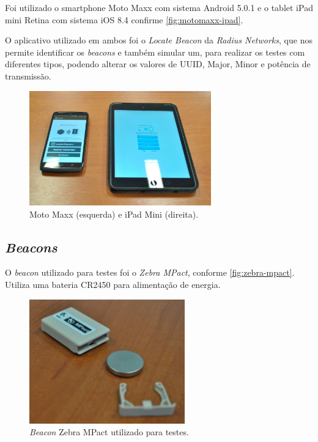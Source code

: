 Foi utilizado o smartphone Moto Maxx com sistema Android 5.0.1 e o tablet iPad mini Retina com sistema iOS 8.4 confirme \autoref{fig:motomaxx-ipad}. 

O aplicativo utilizado em ambos foi o \textit{Locate Beacon} da \textit{Radius Networks}, que nos permite identificar os \textit{beacons} e também simular um, para realizar os testes com diferentes tipos, podendo alterar os valores de UUID, Major, Minor e potência de transmissão. 

\begin{figure}[htb]
	\caption{\label{fig:motomaxx-ipad}Moto Maxx (esquerda) e iPad Mini (direita).}
	\begin{center}
		\includegraphics[width=0.7\textwidth]{img/motomaxx-ipad.jpg}
	\end{center}
\end{figure}

\subsection{\textit{Beacons}}\label{sec:beacons-modo}

O \textit{beacon} utilizado para testes foi o \textit{Zebra MPact}, conforme \autoref{fig:zebra-mpact}. Utiliza uma bateria CR2450 para alimentação de energia. 

\begin{figure}[htb]
	\caption{\label{fig:zebra-mpact}\textit{Beacon} Zebra MPact utilizado para testes.}
	\begin{center}
		\includegraphics[width=0.6\textwidth]{img/beacon-mpact2.jpg}
	\end{center}
\end{figure}

